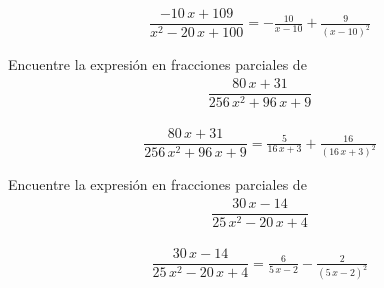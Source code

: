\begin{align*}
	\dfrac{-10 \, x + 109}{x^{2} - 20 \, x + 100}= -\frac{10}{x - 10} + \frac{9}{{\left(x - 10\right)}^{2}}
\end{align*}


{}
\begin{problema}
	Encuentre la expresión en fracciones parciales de
	\begin{align*}
		\dfrac{80 \, x + 31}{256 \, x^{2} + 96 \, x + 9}
	\end{align*}
\end{problema}

\begin{align*}
	\dfrac{80 \, x + 31}{256 \, x^{2} + 96 \, x + 9}= \frac{5}{16 \, x + 3} + \frac{16}{{\left(16 \, x + 3\right)}^{2}}
\end{align*}


{}
\begin{problema}
	Encuentre la expresión en fracciones parciales de
	\begin{align*}
		\dfrac{30 \, x - 14}{25 \, x^{2} - 20 \, x + 4}
	\end{align*}
\end{problema}

\begin{align*}
	\dfrac{30 \, x - 14}{25 \, x^{2} - 20 \, x + 4}= \frac{6}{5 \, x - 2} - \frac{2}{{\left(5 \, x - 2\right)}^{2}}
\end{align*}


